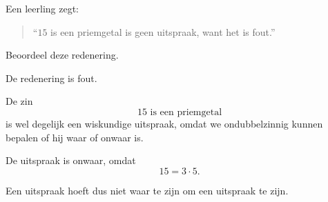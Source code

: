 \documentclass{ximera}
\begin{document}
\begin{oefening}{\oefB \ESS}

Een leerling zegt:

\begin{quote}
``$15$ is een priemgetal is geen uitspraak, want het is fout.''
\end{quote}

Beoordeel deze redenering.

\begin{oplossing}
De redenering is fout.

De zin
\[
15\text{ is een priemgetal}
\]
is wel degelijk een wiskundige uitspraak, omdat we ondubbelzinnig
kunnen bepalen of hij waar of onwaar is.

De uitspraak is onwaar, omdat
\[
15=3\cdot5.
\]

Een uitspraak hoeft dus niet waar te zijn om een uitspraak te zijn.
\end{oplossing}

\end{oefening}
\end{document}
